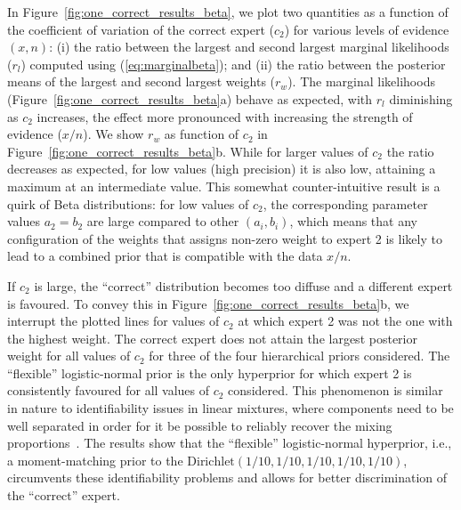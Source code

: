 \documentclass[12pt]{article}
\begin{document}
In Figure~\ref{fig:one_correct_results_beta}, we plot two quantities as a function of the coefficient of variation of the correct expert ($c_2$) for various levels of evidence $(x, n)$: (i) the ratio between the largest and second largest marginal likelihoods ($r_l$)  computed using (\ref{eq:marginalbeta}); and (ii) the ratio between the posterior means of the largest and second largest weights ($r_w$).
The marginal likelihoods (Figure~\ref{fig:one_correct_results_beta}a) behave as expected, with $r_l$ diminishing as $c_2$ increases, the effect more pronounced with increasing the strength of evidence ($x/n$).
We show $r_w$ as function of $c_2$ in Figure~\ref{fig:one_correct_results_beta}b.
While for larger values of $c_2$ the ratio decreases as expected, for low values (high precision) it is also low, attaining a maximum at an intermediate value.
This somewhat counter-intuitive result is a quirk of Beta distributions: for low values of $c_2$, the corresponding parameter values $a_2 = b_2$ are large compared to other $(a_i, b_i)$, which means that any configuration of the weights that assigns non-zero weight to expert 2 is likely to lead to a combined prior that is compatible with the data $x/n$.

If $c_2$ is large, the ``correct'' distribution becomes too diffuse and a different expert is favoured.
To convey this in Figure~\ref{fig:one_correct_results_beta}b, we interrupt the plotted lines for values of $c_2$ at which expert 2 was not the one with the highest weight.
The correct expert does not attain the largest posterior weight for all values of $c_2$ for three of the four hierarchical priors considered. 
The ``flexible'' logistic-normal prior is the only hyperprior for which expert 2 is consistently favoured for all values of $c_2$ considered.
This phenomenon is similar in nature to identifiability issues in linear mixtures, where components need to be well separated in order for it be possible to reliably recover the mixing proportions~\parencite{Yakowitz1968}. 
The results show that the ``flexible'' logistic-normal hyperprior, i.e., a moment-matching prior to the $\text{Dirichlet}(1/10, 1/10, 1/10, 1/10, 1/10)$, circumvents these identifiability problems and allows for better discrimination of the ``correct'' expert.
\end{document}
